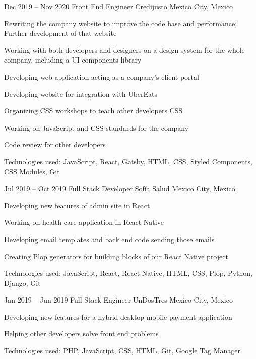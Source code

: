 \begin{sectionlist}
    \sectionlistitemjob
        {Dec 2019 -- Nov 2020}
        {Front End Engineer}
        {Credijusto}
        {Mexico City, Mexico}
        {
            \begin{joblisting}
                \item Rewriting the company website to improve the code base and
                    performance; Further development of that website
                \item Working with both developers and designers on a design
                    system for the whole company, including a UI components
                    library
                \item Developing web application acting as a company's client
                    portal
                \item Developing website for integration with UberEats
                \item Organizing CSS workshops to teach other developers CSS
                \item Working on JavaScript and CSS standards for the company
                \item Code review for other developers
                \item Technologies used: JavaScript, React, Gatsby, HTML, CSS,
                    Styled Components, CSS Modules, Git
            \end{joblisting}
        }

    \sectionlistitemjob
        {Jul 2019 -- Oct 2019}
        {Full Stack Developer}
        {Sofía Salud}
        {Mexico City, Mexico}
        {
            \begin{joblisting}
                \item Developing new features of admin site in React
                \item Working on health care application in React Native
                \item Developing email templates and back end code sending those emails
                \item Creating Plop generators for building blocks of our React
                    Native project
                \item Technologies used: JavaScript, React, React Native,
                    HTML, CSS, Plop, Python, Django, Git
            \end{joblisting}
        }

    \sectionlistitemjob
        {Jan 2019 -- Jun 2019}
        {Full Stack Engineer}
        {UnDosTres}
        {Mexico City, Mexico}
        {
            \begin{joblisting}
                \item Developing new features for a hybrid desktop-mobile
                    payment application
                \item Helping other developers solve front end problems
                \item Technologies used: PHP, JavaScript, CSS, HTML, Git,
                    Google Tag Manager
            \end{joblisting}
        }


\end{sectionlist}
